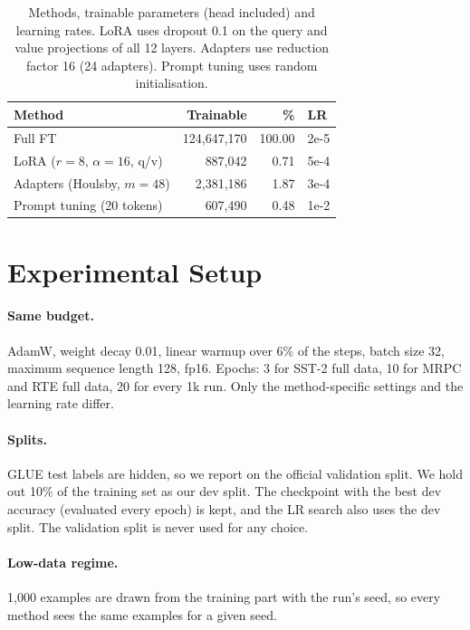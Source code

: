 \documentclass[11pt]{article}
\begin{document}
\begin{table}[t]
\centering
\small
\begin{tabular}{@{}lrrl@{}}
\toprule
Method & Trainable & \% & LR \\
\midrule
Full FT & 124,647,170 & 100.00 & 2e-5 \\
LoRA ($r{=}8$, $\alpha{=}16$, q/v) & 887,042 & 0.71 & 5e-4 \\
Adapters (Houlsby, $m{=}48$) & 2,381,186 & 1.87 & 3e-4 \\
Prompt tuning (20 tokens) & 607,490 & 0.48 & 1e-2 \\
\bottomrule
\end{tabular}
\caption{Methods, trainable parameters (head included) and learning rates. LoRA uses dropout 0.1 on the query and value projections of all 12 layers. Adapters use reduction factor 16 (24 adapters). Prompt tuning uses random initialisation.}
\label{tab:methods}
\end{table}

\section{Experimental Setup}

\paragraph{Same budget.} AdamW, weight decay 0.01, linear warmup over 6\% of the steps, batch size 32, maximum sequence length 128, fp16. Epochs: 3 for SST-2 full data, 10 for MRPC and RTE full data, 20 for every 1k run. Only the method-specific settings and the learning rate differ.

\paragraph{Splits.} GLUE test labels are hidden, so we report on the official validation split. We hold out 10\% of the training set as our dev split. The checkpoint with the best dev accuracy (evaluated every epoch) is kept, and the LR search also uses the dev split. The validation split is never used for any choice.

\paragraph{Low-data regime.} 1,000 examples are drawn from the training part with the run's seed, so every method sees the same examples for a given seed.
\end{document}

